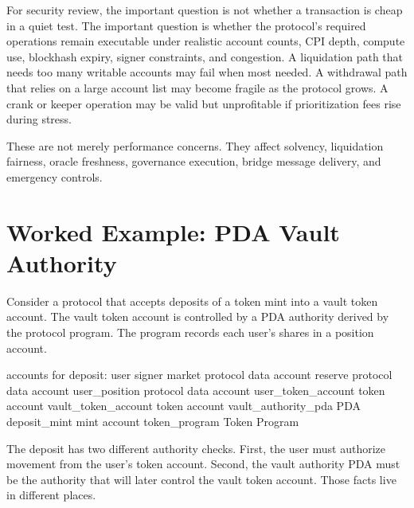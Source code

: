 For security review, the important question is not whether a transaction is cheap in a quiet test. The important question is whether the protocol's required operations remain executable under realistic account counts, CPI depth, compute use, blockhash expiry, signer constraints, and congestion. A liquidation path that needs too many writable accounts may fail when most needed. A withdrawal path that relies on a large account list may become fragile as the protocol grows. A crank or keeper operation may be valid but unprofitable if prioritization fees rise during stress.

These are not merely performance concerns. They affect solvency, liquidation fairness, oracle freshness, governance execution, bridge message delivery, and emergency controls.

\section{Worked Example: PDA Vault Authority}

Consider a protocol that accepts deposits of a token mint into a vault token account. The vault token account is controlled by a PDA authority derived by the protocol program. The program records each user's shares in a position account.

\begin{codeblock}
accounts for deposit:
    user                     signer
    market                   protocol data account
    reserve                  protocol data account
    user_position            protocol data account
    user_token_account       token account
    vault_token_account      token account
    vault_authority_pda      PDA
    deposit_mint             mint account
    token_program            Token Program
\end{codeblock}

The deposit has two different authority checks. First, the user must authorize movement from the user's token account. Second, the vault authority PDA must be the authority that will later control the vault token account. Those facts live in different places.

